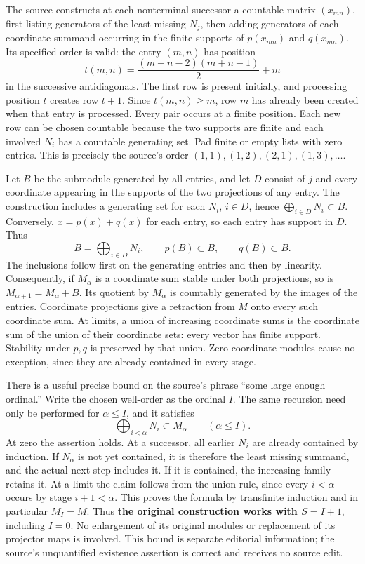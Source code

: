 The source constructs at each nonterminal successor a countable matrix \((x_{mn})\), first listing generators of the least missing \(N_j\), then adding generators of each coordinate summand occurring in the finite supports of \(p(x_{mn})\) and \(q(x_{mn})\). Its specified order is valid: the entry \((m,n)\) has position \[
t(m,n)=\frac{(m+n-2)(m+n-1)}2+m
\] in the successive antidiagonals. The first row is present initially, and processing position \(t\) creates row \(t+1\). Since \(t(m,n)\geq m\), row \(m\) has already been created when that entry is processed. Every pair occurs at a finite position. Each new row can be chosen countable because the two supports are finite and each involved \(N_i\) has a countable generating set. Pad finite or empty lists with zero entries. This is precisely the source's order \((1,1),(1,2),(2,1),(1,3),\ldots\).

Let \(B\) be the submodule generated by all entries, and let \(D\) consist of \(j\) and every coordinate appearing in the supports of the two projections of any entry. The construction includes a generating set for each \(N_i\), \(i\in D\), hence \(\bigoplus_{i\in D}N_i\subset B\). Conversely, \(x=p(x)+q(x)\) for each entry, so each entry has support in \(D\). Thus \[
B=\bigoplus_{i\in D}N_i,
\qquad p(B)\subset B,\qquad q(B)\subset B.
\] The inclusions follow first on the generating entries and then by linearity. Consequently, if \(M_\alpha\) is a coordinate sum stable under both projections, so is \(M_{\alpha+1}=M_\alpha+B\). Its quotient by \(M_\alpha\) is countably generated by the images of the entries. Coordinate projections give a retraction from \(M\) onto every such coordinate sum. At limits, a union of increasing coordinate sums is the coordinate sum of the union of their coordinate sets: every vector has finite support. Stability under \(p,q\) is preserved by that union. Zero coordinate modules cause no exception, since they are already contained in every stage.

There is a useful precise bound on the source's phrase ``some large enough ordinal.'' Write the chosen well-order as the ordinal \(I\). The same recursion need only be performed for \(\alpha\leq I\), and it satisfies \[
\bigoplus_{i<\alpha}N_i\subset M_\alpha
\qquad(\alpha\leq I).
\] At zero the assertion holds. At a successor, all earlier \(N_i\) are already contained by induction. If \(N_\alpha\) is not yet contained, it is therefore the least missing summand, and the actual next step includes it. If it is contained, the increasing family retains it. At a limit the claim follows from the union rule, since every \(i<\alpha\) occurs by stage \(i+1<\alpha\). This proves the formula by transfinite induction and in particular \(M_I=M\). Thus \textbf{the original construction works with \(S=I+1\)}, including \(I=0\). No enlargement of its original modules or replacement of its projector maps is involved. This bound is separate editorial information; the source's unquantified existence assertion is correct and receives no source edit.

